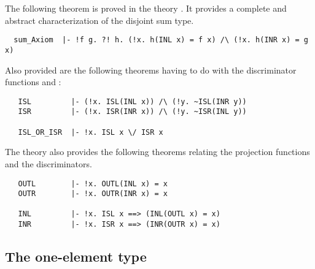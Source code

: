 The following theorem is proved in the theory . It provides a
complete and abstract characterization of the disjoint sum type.

\begin{hol}
\begin{verbatim}
  sum_Axiom  |- !f g. ?! h. (!x. h(INL x) = f x) /\ (!x. h(INR x) = g x)
\end{verbatim}
\end{hol}

\noindent Also provided are the following theorems having to
do with the discriminator functions  and :

\begin{hol}
\begin{verbatim}
   ISL         |- (!x. ISL(INL x)) /\ (!y. ~ISL(INR y))
   ISR         |- (!x. ISR(INR x)) /\ (!y. ~ISR(INL y))

   ISL_OR_ISR  |- !x. ISL x \/ ISR x
\end{verbatim}
\end{hol}

\noindent The  theory also provides the following theorems
relating the projection functions and the discriminators.

\begin{hol}
{\small
\begin{verbatim}
   OUTL        |- !x. OUTL(INL x) = x
   OUTR        |- !x. OUTR(INR x) = x

   INL         |- !x. ISL x ==> (INL(OUTL x) = x)
   INR         |- !x. ISR x ==> (INR(OUTR x) = x)
\end{verbatim}
}
\end{hol}

\subsection{The one-element type}%
%
%

